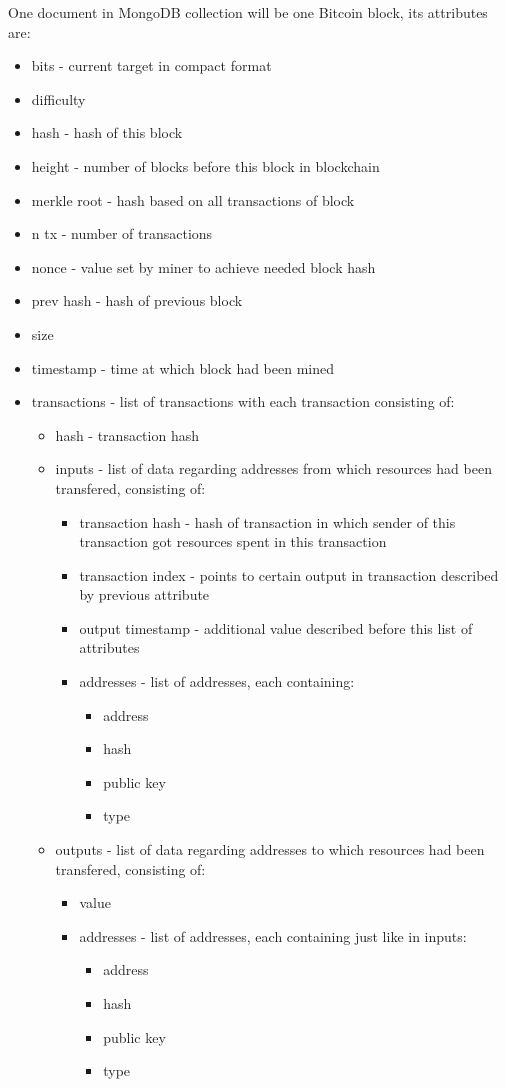 \documentclass[12pt, en, eng, oneside]{mgr}
\begin{document}
One document in MongoDB collection will be one Bitcoin block, its attributes are:
\begin{itemize}
\item
bits - current target in compact format \cite{bitcoin-wiki-bha}
\item
difficulty
\item
hash - hash of this block
\item
height - number of blocks before this block in blockchain
\item
merkle root - hash based on all transactions of block
\item
n tx - number of transactions
\item
nonce - value set by miner to achieve needed block hash
\item
prev hash - hash of previous block
\item
size
\item
timestamp - time at which block had been mined
\item
transactions - list of transactions with each transaction consisting of:
\begin{itemize}
\item
hash - transaction hash
\item
inputs - list of data regarding addresses from which resources had been transfered, consisting of:
\begin{itemize}
\item
transaction hash - hash of transaction in which sender of this transaction got resources spent in this transaction
\item
transaction index - points to certain output in transaction described by previous attribute
\item
output timestamp - additional value described before this list of attributes
\item addresses - list of addresses, each containing:
\begin{itemize}
\item
address
\item
hash
\item
public key
\item
type
\end{itemize}
\end{itemize}	
\item
outputs - list of data regarding addresses to which resources had been transfered, consisting of:	
\begin{itemize}
\item
value
\item addresses - list of addresses, each containing just like in inputs:
\begin{itemize}
\item
address
\item
hash
\item
public key
\item
type
\end{itemize}
\end{itemize} 	
\end{itemize}
\end{itemize}
\end{document}

